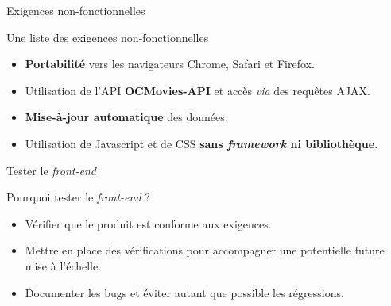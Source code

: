 \begin{frame}{Exigences non-fonctionnelles}
  \begin{block}{Une liste des exigences non-fonctionnelles}
    \begin{itemize}
    \item \textbf{Portabilité} vers les navigateurs Chrome, Safari et Firefox.
    \item Utilisation de l'API \textbf{OCMovies-API} et accès \textit{via} des requêtes AJAX.
    \item \textbf{Mise-à-jour automatique} des données.
    \item Utilisation de Javascript et de CSS \textbf{sans \textit{framework} ni bibliothèque}.
    \end{itemize}
  \end{block}
\end{frame}

\begin{frame}{Tester le \textit{front-end}}


   {
    \begin{block}{Pourquoi tester le \textit{front-end} ?}
      \begin{itemize}
      \item Vérifier que le produit est conforme aux exigences.
      \item Mettre en place des vérifications pour accompagner une
        potentielle future mise à l'échelle.
      \item Documenter les bugs et éviter autant que possible les
        régressions.
      \end{itemize}
    \end{block}
  }
  
  
\end{frame}

